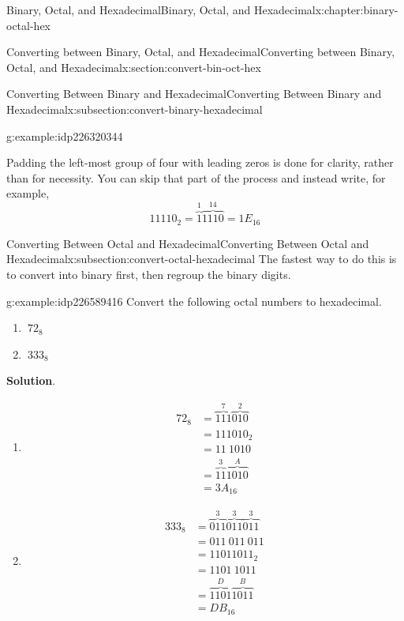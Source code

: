 \documentclass[twoside,10pt,]{book}
\newcommand{\blocktitlefont}{\relax}
\numberwithin{equation}{section}
\newcommand{\amp}{&}
\begin{document}
\begin{chapterptx}{Binary, Octal, and Hexadecimal}{}{Binary, Octal, and Hexadecimal}{}{}{x:chapter:binary-octal-hex}
\begin{sectionptx}{Converting between Binary, Octal, and Hexadecimal}{}{Converting between Binary, Octal, and Hexadecimal}{}{}{x:section:convert-bin-oct-hex}
\begin{subsectionptx}{Converting Between Binary and Hexadecimal}{}{Converting Between Binary and Hexadecimal}{}{}{x:subsection:convert-binary-hexadecimal}
\begin{example}{}{g:example:idp226320344}
\begin{enumerate}
\end{enumerate}
Padding the left-most group of four with leading zeros is done for clarity, rather than for necessity.  You can skip that part of the process and instead write, for example,%
\begin{equation*}
11110_2=\overbrace{1}^1\overbrace{1110}^{14}=1E_{16}
\end{equation*}
%
\end{example}
\end{subsectionptx}
%
%
\typeout{************************************************}
\typeout{************************************************}
%
\begin{subsectionptx}{Converting Between Octal and Hexadecimal}{}{Converting Between Octal and Hexadecimal}{}{}{x:subsection:convert-octal-hexadecimal}
The fastest way to do this is to convert into binary first, then regroup the binary digits.%
\begin{example}{}{g:example:idp226589416}%
Convert the following octal numbers to hexadecimal. %
\begin{enumerate}
\item{}\(\displaystyle \ 72_8\)%
\item{}\(\displaystyle \ 333_8\)%
\end{enumerate}
\par\smallskip%
\noindent\textbf{\blocktitlefont Solution}.\label{g:solution:idp226591848}{}\hypertarget{g:solution:idp226591848}{}\quad{}%
\begin{enumerate}
\item{}%
\begin{align*}
72_8 \amp = \overbrace{111}^7\overbrace{010}^2\\
\amp = 111010_2\\
\amp = 11\ 1010\\
\amp = \overbrace{11}^3\overbrace{1010}^{A}\\
\amp = 3A_{16}
\end{align*}
%
\item{}%
\begin{align*}
333_8 \amp =\overbrace{011}^3\overbrace{011}^3\overbrace{011}^3\\
\amp = 011\ 011\ 011\\
\amp = 11011011_2\\
\amp = 1101\ 1011\\
\amp = \overbrace{1101}^{D}\overbrace{1011}^{B}\\
\amp = DB_{16}
\end{align*}

\end{enumerate}
\end{example}
\end{subsectionptx}
\end{sectionptx}
\end{chapterptx}
\end{document}
